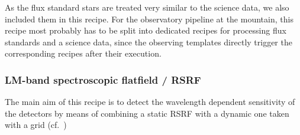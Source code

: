 As the flux standard stars are treated very similar to the science
data, we also included them in this recipe. For the observatory
pipeline at the mountain, this recipe most probably has to be split
into dedicated recipes for processing flux standards and a science
data, since the observing templates directly trigger the corresponding
recipes after their execution.

\clearpage

\subsubsection{LM-band spectroscopic flatfield / RSRF}\label{subsubsection:LM_LSS_flat}

The main aim of this recipe is to detect the wavelength dependent
sensitivity of the detectors by means of combining a static \ac{RSRF}
with a dynamic one taken with a grid (cf.~\cite{METIS-calibration_plan})

